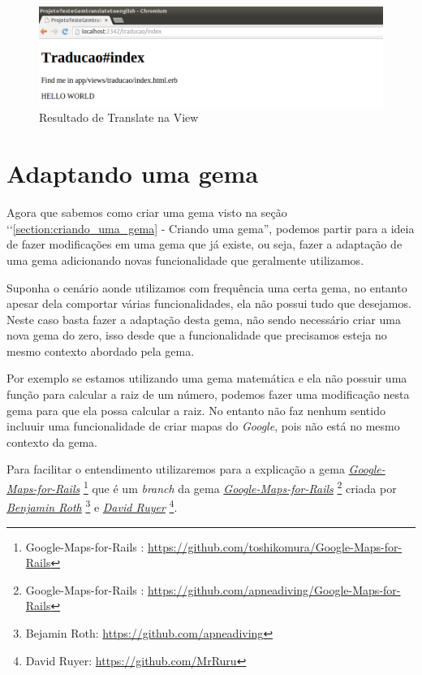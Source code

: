  \begin{figure}[ht]
  \includegraphics[scale=0.49]{images/resultado_de_translate_na_view.png}
  \caption{Resultado de Translate na View}
  \label{fig:resultado_de_translate_na_view}
\end{figure}
 
\section{Adaptando uma gema}
\label{section:adaptando_uma_gema}

Agora que sabemos como criar uma gema visto na seção ‘‘\ref{section:criando_uma_gema} - Criando uma gema'', 
podemos partir para a ideia de fazer modificações em uma gema que já existe, ou seja, fazer a adaptação de 
uma gema adicionando novas funcionalidade que geralmente utilizamos. 

Suponha o cenário aonde utilizamos com frequência uma certa gema, no entanto apesar dela comportar várias 
funcionalidades, ela não possui tudo que desejamos. Neste caso basta fazer a adaptação desta gema, não 
sendo necessário criar uma nova gema do zero, isso desde que a funcionalidade que precisamos 
esteja no mesmo contexto abordado pela gema. 

Por exemplo se estamos utilizando uma gema matemática e ela não possuir uma função para calcular a 
raiz de um número, podemos fazer uma modificação nesta gema para que ela possa calcular a raiz. 
No entanto não faz nenhum sentido incluuir uma funcionalidade de criar mapas do \emph{Google}, pois 
não está no mesmo contexto da gema.

Para facilitar o entendimento utilizaremos para a explicação a gema 
\emph{\href{https://github.com/toshikomura/Google-Maps-for-Rails}{Google-Maps-for-Rails}} 
\footnote{Google-Maps-for-Rails : \url{https://github.com/toshikomura/Google-Maps-for-Rails}} que é um 
\emph{branch} da gema 
\emph{\href{https://github.com/apneadiving/Google-Maps-for-Rails}{Google-Maps-for-Rails}} 
\footnote{Google-Maps-for-Rails : \url{https://github.com/apneadiving/Google-Maps-for-Rails}} criada por 
\emph{\href{https://github.com/apneadiving}{Benjamin Roth}} 
\footnote{Bejamin Roth: \url{https://github.com/apneadiving}} e 
\emph{\href{https://github.com/MrRuru}{David Ruyer}} \footnote{David Ruyer: \url{https://github.com/MrRuru}}.

